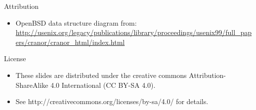 \documentclass[aspectratio=169]{beamer}
\newcommand{\bi}{\begin{itemize}}
\newcommand{\ei}{\end{itemize}}
\begin{document}
\begin{frame}[noframenumbering]{Attribution}
  \tiny
  \bi
\item OpenBSD data structure diagram from:\\
  \url{http://usenix.org/legacy/publications/library/proceedings/usenix99/full_papers/cranor/cranor_html/index.html}
  \ei
\end{frame}

\begin{frame}[noframenumbering]{License}
  \bi
\item These slides are distributed under the creative commons
  Attribution-ShareAlike 4.0 International (CC BY-SA 4.0).
\item See http://creativecommons.org/licenses/by-sa/4.0/ for details.
  \ei
\end{frame}
\end{document}
